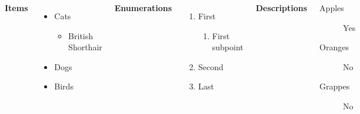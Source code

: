\documentclass[
11pt,notheorems,hyperref={pdfauthor=whatever}
]{beamer}
\begin{document}
\begin{frame}
    \begin{columns}[T,onlytextwidth]
      \textbf{Items}
      \begin{itemize}
        \item Cats 
        \begin{itemize}
            \item British Shorthair
        \end{itemize}
        \item Dogs \item Birds
      \end{itemize}

      \textbf{Enumerations}
      \begin{enumerate}
        \item First 
        \begin{enumerate}
            \item First subpoint
        \end{enumerate}
        \item Second \item Last
      \end{enumerate}

      \textbf{Descriptions}
      \begin{description}
        \item[Apples] Yes \item[Oranges] No \item[Grappes] No
      \end{description}
\end{columns}
\end{frame}
\end{document}
